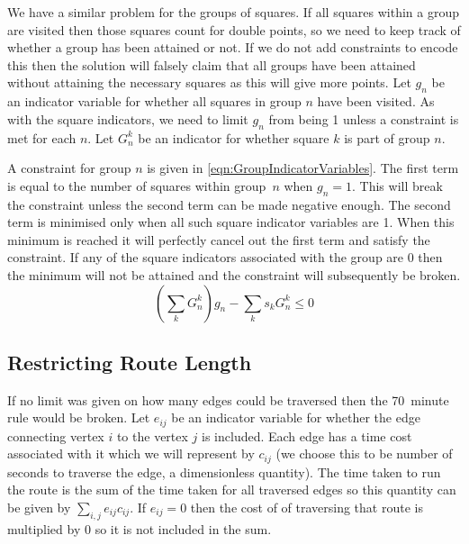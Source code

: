 We have a similar problem for the groups of squares. If all squares within a group are visited then those squares count for double points, so we need to keep track of whether a group has been attained or not. If we do not add constraints to encode this then the solution will falsely claim that all groups have been attained without attaining the necessary squares as this will give more points. Let $g_n$ be an indicator variable for whether all squares in group $n$ have been visited. As with the square indicators, we need to limit $g_n$ from being 1 unless a constraint is met for each $n$. Let $G_n^k$ be an indicator for whether square $k$ is part of group $n$.

A constraint for group $n$ is given in \eqref{eqn:GroupIndicatorVariables}. The first term is equal to the number of squares within group~$n$ when $g_n = 1$. This will break the constraint unless the second term can be made negative enough. The second term is minimised only when all such square indicator variables are 1. When this minimum is reached it will perfectly cancel out the first term and satisfy the constraint. If any of the square indicators associated with the group are 0 then the minimum will not be attained and the constraint will subsequently be broken.
\begin{equation}
	\left( \sum_k G_n^k \right) g_n - \sum_k s_k G_n^k \le 0
	\label{eqn:GroupIndicatorVariables}
\end{equation}

\subsection{Restricting Route Length}
\label{sec:RestrictingRouteLength}

If no limit was given on how many edges could be traversed then the 70~minute rule would be broken. Let $e_{ij}$ be an indicator variable for whether the edge connecting vertex $i$ to the vertex $j$ is included. Each edge has a time cost associated with it which we will represent by $c_{ij}$ (we choose this to be number of seconds to traverse the edge, a dimensionless quantity). The time taken to run the route is the sum of the time taken for all traversed edges so this quantity can be given by $\sum_{i, j} e_{ij} c_{ij}$. If $e_{ij} = 0$ then the cost of of traversing that route is multiplied by $0$ so it is not included in the sum.

